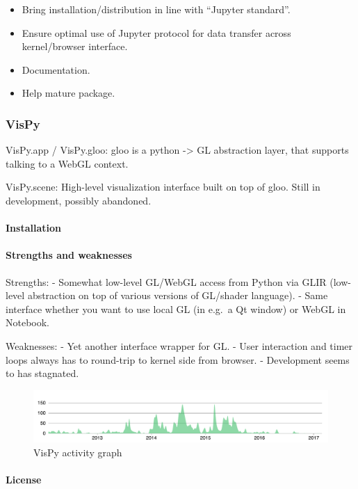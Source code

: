 \begin{itemize}
\tightlist
\item
  Bring installation/distribution in line with ``Jupyter standard''.
\item
  Ensure optimal use of Jupyter protocol for data transfer across
  kernel/browser interface.
\item
  Documentation.
\item
  Help mature package.
\end{itemize}

\subsubsection{VisPy}

VisPy.app / VisPy.gloo: gloo is a python -\textgreater{} GL abstraction
layer, that supports talking to a WebGL context.

VisPy.scene: High-level visualization interface built on top of gloo.
Still in development, possibly abandoned.

\paragraph{Installation}

\paragraph{Strengths and weaknesses}

Strengths: - Somewhat low-level GL/WebGL access from Python via GLIR
(low-level abstraction on top of various versions of GL/shader
language). - Same interface whether you want to use local GL (in e.g.~a
Qt window) or WebGL in Notebook.

Weaknesses: - Yet another interface wrapper for GL. - User interaction
and timer loops always has to round-trip to kernel side from browser. -
Development seems to has stagnated.

\begin{figure}
\centering
\includegraphics[width=0.6\paperwidth]{existing_tools/vispy_activity.pdf}
\caption{VisPy activity graph}
\end{figure}

\paragraph{License}

